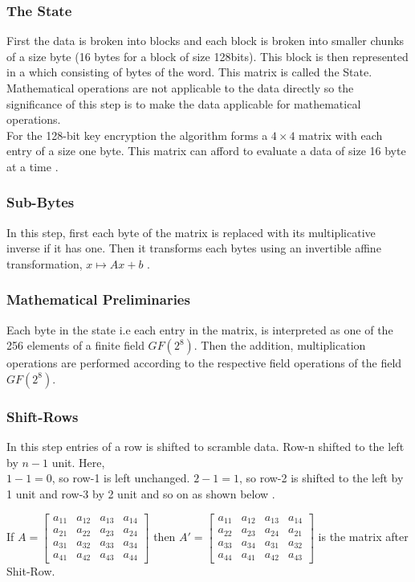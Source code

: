 \documentclass[11pt]{amsart}
\theoremstyle{plain}
\theoremstyle{definition}
\numberwithin{equation}{section}
\begin{document}
\subsubsection{The State}
First the data is broken into blocks and each block is broken into smaller chunks of a size byte (16 bytes for a block of size 128bits). This block is then represented in a  which consisting of bytes of the word. This matrix is called the State.\\
Mathematical operations are not applicable to the data directly so the significance of this step is to make the data applicable for mathematical operations.\\
For the 128-bit key encryption the algorithm forms a \(4 \times 4\) matrix with each entry of a size one byte. This matrix can afford to evaluate a data of size 16 byte at a time \cite{aes}.

\subsubsection{Sub-Bytes}
In this step, first each byte of the matrix is replaced with its multiplicative inverse if it has one. Then it transforms each bytes using an invertible affine transformation, \(x \mapsto Ax+b\) \cite{aes}.

\subsubsection{Mathematical Preliminaries}
Each byte in the state i.e each entry in the matrix, is interpreted as one of the 256 elements of a finite field \(GF(2^8)\). Then the addition, multiplication operations are performed according to the respective field operations of the field \(GF(2^8)\).

\subsubsection{Shift-Rows}
In this step entries of a row is shifted to scramble data. Row-n shifted to the left by \(n-1\) unit. Here,\\
\(1-1=0\), so row-1 is left unchanged. \(2-1=1\), so row-2 is shifted to the left by 1 unit and row-3 by 2 unit and so on as shown below \cite{aes}.

If \(A=\begin{bmatrix}
    a_{11}&a_{12}&a_{13}&a_{14}\\
    a_{21}&a_{22}&a_{23}&a_{24}\\
    a_{31}&a_{32}&a_{33}&a_{34}\\
    a_{41}&a_{42}&a_{43}&a_{44}
    \end{bmatrix}\) \hspace{3mm} then \(A'=\begin{bmatrix}
    a_{11}&a_{12}&a_{13}&a_{14}\\
    a_{22}&a_{23}&a_{24}&a_{21}\\
    a_{33}&a_{34}&a_{31}&a_{32}\\
    a_{44}&a_{41}&a_{42}&a_{43}
    \end{bmatrix}\)  is the matrix after Shit-Row.
\end{document}
